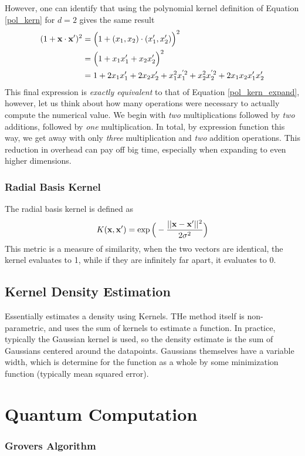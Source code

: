However, one can identify that using the polynomial kernel definition of Equation \ref{pol_kern} for $d=2$ gives the same result
\begin{align}
	(1+ \textbf{x}\cdot \textbf{x}')^2 &= \Big(1+(x_1,x_2)\cdot(x_1',x_2')\Big)^2\\
	&= \Big(1+x_1x_1'+x_2x_2'\Big)^2\\
	&= 1 + 2x_1x_1' + 2x_2x_2' + x_1^2x_1^{'2}+x_2^2x_2^{'2} + 2x_1x_2x_1'x_2'
\end{align}
This final expression is \emph{exactly equivalent} to that of Equation \ref{pol_kern_expand}, however, let us think about how many operations were necessary to actually compute the numerical value. We begin with \emph{two} multiplications followed by \emph{two} additions, followed by \emph{one} multiplication. In total, by expression function this way, we get away with only \emph{three} multiplication and \emph{two} addition operations. This reduction in overhead can pay off big time, especially when expanding to even higher dimensions.

\subsubsection{Radial Basis Kernel}
The radial basis kernel is defined as 
\begin{align}
		K(\textbf{x},\textbf{x}') = \exp\Big(-\frac{||\textbf{x}-\textbf{x}'||^2}{2\sigma^2}\Big)
\end{align}
This metric is a measure of similarity, when the two vectors are identical, the kernel evaluates to 1, while if they are infinitely far apart, it evaluates to 0.

\subsection{Kernel Density Estimation}
Essentially estimates a density using Kernels. THe method itself is non-parametric, and uses the sum of kernels to estimate a function. In practice, typically the Gaussian kernel is used, so the density estimate is the sum of Gaussians centered around the datapoints. Gaussians themselves have a variable width, which is determine for the function as a whole by some minimization function (typically mean squared error).

\section{Quantum Computation}
\subsubsection{Grovers Algorithm}
